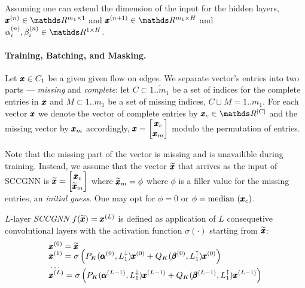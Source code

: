 \documentclass{mynotes}
\begin{document}
Assuming one can extend the dimension of the input for the hidden layers, \( \b x^{(n)} \in \ds R^{m_1 \times 1}\) and \( \b x^{(n+1)} \in \ds R^{m_1 \times H} \) and \( \alpha_i^{(n)}, \beta_i^{(n)} \in \ds R^{ 1 \times H } \).


\paragraph{ Training, Batching, and Masking. }

Let \( \pmb{x} \in C_1 \) be a given given flow on edges. We separate vector's entries into two parts --- \emph{missing} and \emph{complete}: let \( C \subset \bar{1..m_1} \) be a set of indices for the complete entries in \( \pmb{x} \) and \( M \subset 1..m_1\) be a set of missing indices, \( C \sqcup M = 1..m_1\). For each vector \( \pmb{x} \) we denote the vector of complete entries by \( \b x_c \in \ds R^{| C | }\) and the missing vector by \(\pmb{x}_m \) accordingly, \( \pmb{x} = \begin{bmatrix} \pmb{x}_c \\ \pmb{x}_m \end{bmatrix} \) modulo the permutation of entries.

Note that the missing part of the vector is missing and is unavailible during training. Instead, we assume that the vector \( \widetilde{\pmb{x}} \) that arrives as the input of SCCGNN is \( \widetilde{\pmb{x}} = \begin{bmatrix} \pmb{x}_c \\ \widetilde{\pmb{x}}_m \end{bmatrix} \) where \( \widetilde{\pmb{x}}_m = \phi \) where \( \phi \) is a filler value for the missing entries, an \emph{initial guess}. One may opt for  \( \phi = 0 \) or \( \phi = \mathrm{median}\, \left(  \pmb{x}_c \right) \).

\begin{definition}[SCCGNN]
      \(L\)-layer \emph{SCCGNN} \( f(\widetilde{\pmb{x}}) = \pmb{x}^{(L)}\) is defined as application of \( L \) consequetive convolutional layers with the activation function \( \sigma(\cdot )\) starting from \( \widetilde{\pmb{x}}\):
      \begin{equation}
            \begin{aligned}
                  & \pmb{x}^{(0)} = \widetilde{\pmb{x}} \\[-0.5\baselineskip]
                  & \pmb{x}^{(1)} = \sigma \left( P_K( \pmb{\alpha}^{(0)}, L_{1}^{\downarrow}) \pmb{x}^{(0)} + Q_K( \pmb{\beta}^{(0)}, L_{1}^{\uparrow}) \pmb{x}^{(0)}  \right)  \\[-0.5\baselineskip]
                  & \ldots \\[-0.5\baselineskip]
                  & \pmb{x}^{(L)} = \sigma \left( P_K( \pmb{\alpha}^{(L-1)}, L_{1}^{\downarrow}) \pmb{x}^{(L-1)} + Q_K( \pmb{\beta}^{(L-1)}, L_{1}^{\uparrow}) \pmb{x}^{(L-1)}  \right) 
            \end{aligned}
      \end{equation}
\end{definition}
\end{document}
